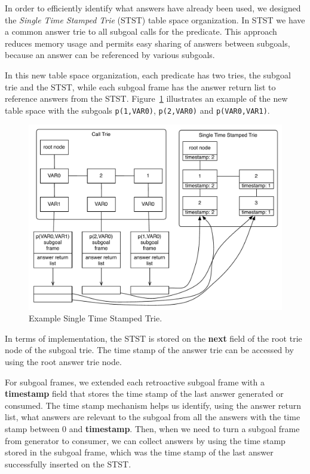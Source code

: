 In order to efficiently identify what answers have already been used, we designed
the \textit{Single Time Stamped Trie} (STST) table space organization.
In STST we have a common answer trie to all subgoal calls for the predicate. This approach
reduces memory usage and permits easy sharing of answers between subgoals, because an
answer can be referenced by various subgoals.

In this new table space organization, each predicate has two tries, the subgoal trie and
the STST, while each subgoal frame has the answer return list to reference answers
from the STST.
Figure~\ref{fig:stst} illustrates an example of the new table space with the
subgoals \texttt{p(1,VAR0)}, \texttt{p(2,VAR0)} and \texttt{p(VAR0,VAR1)}.

\begin{figure}[ht]
  \centering
    \includegraphics[scale=0.6]{stst.pdf}
  \caption{Example Single Time Stamped Trie.}
  \label{fig:stst}
\end{figure}

In terms of implementation, the STST is stored on the \textbf{next} field of the root
trie node of the subgoal trie. The time stamp of the answer trie can be accessed by
using the root answer trie node.

For subgoal frames, we extended each retroactive subgoal
frame with a \textbf{timestamp} field that stores the time stamp of the last answer
generated or consumed.
The time stamp mechanism helps us identify, using the answer return list, what answers
are relevant to the subgoal from all the answers with the time stamp between 0 and
\textbf{timestamp}. Then, when we need to turn a subgoal frame from generator to consumer,
we can collect answers by using the time stamp stored in the subgoal frame, which was the
time stamp of the last answer successfully inserted on the STST.

